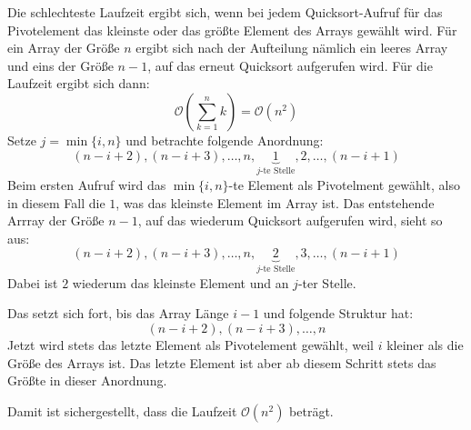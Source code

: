 \documentclass{scrartcl}
\begin{document}
Die schlechteste Laufzeit ergibt sich, wenn bei jedem Quicksort-Aufruf für das Pivotelement das kleinste oder das größte Element des Arrays gewählt wird.
Für ein Array der Größe $n$ ergibt sich nach der Aufteilung nämlich ein leeres Array und eins der Größe $n-1$, auf das erneut Quicksort aufgerufen wird.
Für die Laufzeit ergibt sich dann:
\[
\mathcal O\left(\sum_{k=1}^nk\right) = \mathcal O(n^2)
\]
Setze $j=\min\{i,n\}$ und betrachte folgende Anordnung:
\[
(n-i+2), (n-i+3), \dotsc, n, \underbrace{1}_{j\text{-te Stelle}}, 2, \dotsc, (n-i+1)
\]
Beim ersten Aufruf wird das $\min\{i,n\}$-te Element als Pivotelment gewählt, also in diesem Fall die $1$, was das kleinste Element im Array ist.
Das entstehende Arrray der Größe $n-1$, auf das wiederum Quicksort aufgerufen wird, sieht so aus:
\[
(n-i+2), (n-i+3), \dotsc, n, \underbrace{2}_{j\text{-te Stelle}}, 3, \dotsc, (n-i+1)
\]
Dabei ist $2$ wiederum das kleinste Element und an $j$-ter Stelle.

Das setzt sich fort, bis das Array Länge $i-1$ und folgende Struktur hat:
\[
(n-i+2), (n-i+3), \dotsc, n
\]
Jetzt wird stets das letzte Element als Pivotelement gewählt, weil $i$ kleiner als die Größe des Arrays ist.
Das letzte Element ist aber ab diesem Schritt stets das Größte in dieser Anordnung.

Damit ist sichergestellt, dass die Laufzeit $\mathcal O(n^2)$ beträgt.
\end{document}
